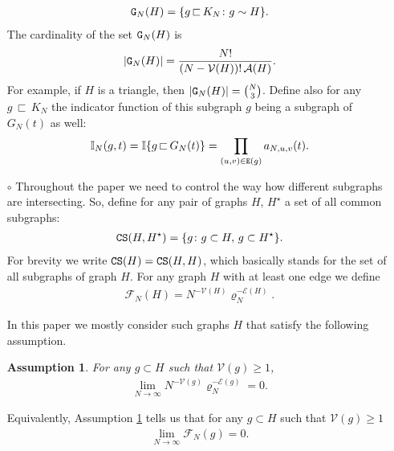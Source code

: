 \documentclass[11pt,reqno]{amsart}
\numberwithin{equation}{section}
\newcommand{\abs}[1]{\left\lvert #1 \right\rvert}
\newtheorem{ass}[theo]{Assumption}
\begin{document}
\begin{itemize}
\begin{align*}
    {\tt G}_N({H}) = \{g{\,\sqsubset\,} K_N\colon g\sim {H}\}.
\end{align*}
The cardinality of the set {${\tt G}_N(H)$ is}
\begin{align}
    \abs{{\tt G}_N({H})} = \frac{N!}{(N-\mathcal{V}({H}))!\,\mathcal{A}({H})}.\label{G_cardinality}
\end{align}
{For example, if $H$ is a triangle, then $\abs{{\tt G}_N(H)} = \binom{N}{3}$.} Define also for any ${g\,\sqsubset\, K_N}$ the indicator function of this subgraph $g$ being a subgraph of $G_N(t)$ as well:
\begin{align}
    \mathbb{I}_N(g,t) = \mathbb{I}\{g{\,\sqsubset\,} G_N(t)\} = \prod_{(u,v)\in{\tt E}(g)}a_{N,u,v}(t).\label{I_N_def}
\end{align}

\item[$\circ$]
Throughout the paper we need to control the way how different subgraphs are intersecting. So, define for any pair of graphs $H$, ${H}^{\star}$ a set of all common subgraphs:
\begin{align*}
    {\tt CS}({H,H^{\star}}) = \{g\colon g\subset {H},\,g\subset {H^{\star}}\}.
\end{align*}
For brevity we write ${\tt CS}({H}) = {\tt CS}({H},{H})$, which basically stands for the set of all subgraphs of graph $H$.
For any graph $H$ with at least one edge we define 
\begin{align}
    \mathcal{F}_N({H}) = N^{-\mathcal{V}({H})}\varrho_N^{-\mathcal{E}({H})}.\label{F_claim_0}
\end{align}{In this paper we mostly consider such graphs $H$ that satisfy the following assumption.
\begin{ass}\label{ass:ass3}
    {For any $g\subset H$ such that $\mathcal{V}(g)\geqslant 1$,
    \begin{align}
        \lim_{N\to\infty}N^{-\mathcal{V}(g)}\varrho_N^{-\mathcal{E}(g)} = 0.\label{graph_assumption}
    \end{align}}
\end{ass}
Equivalently, Assumption \ref{ass:ass3} tells us that for any $g\subset H$ such that $\mathcal{V}(g)\geqslant 1$
\begin{align*}
    \lim_{N\to\infty}\mathcal{F}_N(g) = 0.
\end{align*}

}
\end{itemize}
\end{document}
